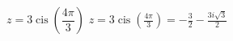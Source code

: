 { $z = 3\operatorname{cis}\left(\dfrac{4\pi}{3}\right)$}
{ $z = 3\operatorname{cis}\left(\frac{4\pi}{3}\right) = -\frac{3}{2} - \frac{3i\sqrt{3}}{2}$}
